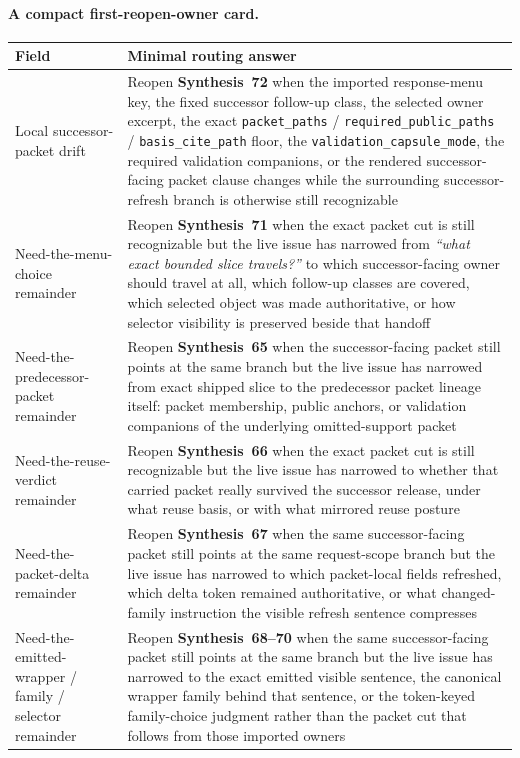 \documentclass[11pt]{article}
\begin{document}
\clearpage
\paragraph{A compact first-reopen-owner card.}
\begin{center}
\small
\begin{tabularx}{\linewidth}{@{}LY@{}}
\toprule
Field & Minimal routing answer \\
\midrule
Local successor-packet drift & Reopen \textbf{Synthesis~72} when the imported response-menu key, the fixed successor follow-up class, the selected owner excerpt, the exact \nolinkurl{packet_paths} / \nolinkurl{required_public_paths} / \nolinkurl{basis_cite_path} floor, the \nolinkurl{validation_capsule_mode}, the required validation companions, or the rendered successor-facing packet clause changes while the surrounding successor-refresh branch is otherwise still recognizable \\
Need-the-menu-choice remainder & Reopen \textbf{Synthesis~71} when the exact packet cut is still recognizable but the live issue has narrowed from \emph{``what exact bounded slice travels?''} to which successor-facing owner should travel at all, which follow-up classes are covered, which selected object was made authoritative, or how selector visibility is preserved beside that handoff \\
Need-the-predecessor-packet remainder & Reopen \textbf{Synthesis~65} when the successor-facing packet still points at the same branch but the live issue has narrowed from exact shipped slice to the predecessor packet lineage itself: packet membership, public anchors, or validation companions of the underlying omitted-support packet \\
Need-the-reuse-verdict remainder & Reopen \textbf{Synthesis~66} when the exact packet cut is still recognizable but the live issue has narrowed to whether that carried packet really survived the successor release, under what reuse basis, or with what mirrored reuse posture \\
Need-the-packet-delta remainder & Reopen \textbf{Synthesis~67} when the same successor-facing packet still points at the same request-scope branch but the live issue has narrowed to which packet-local fields refreshed, which delta token remained authoritative, or what changed-family instruction the visible refresh sentence compresses \\
Need-the-emitted-wrapper / family / selector remainder & Reopen \textbf{Synthesis~68--70} when the same successor-facing packet still points at the same branch but the live issue has narrowed to the exact emitted visible sentence, the canonical wrapper family behind that sentence, or the token-keyed family-choice judgment rather than the packet cut that follows from those imported owners \\

\end{tabularx}
\end{center}
\end{document}
